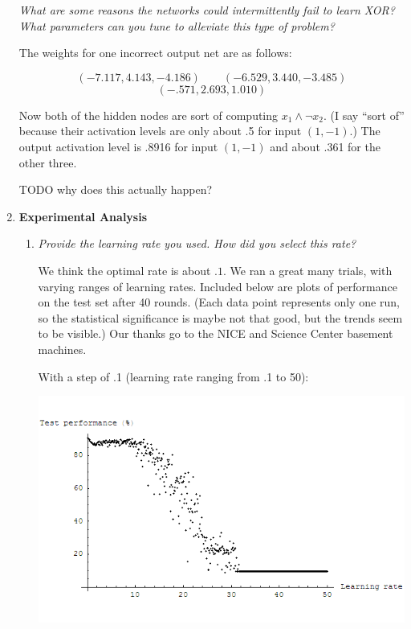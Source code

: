 \documentclass{article}
\begin{document}
\begin{enumerate}
    \textit{What are some reasons the networks could intermittently
      fail to learn XOR?  What parameters can you tune to alleviate
      this type of problem?}

    The weights for one incorrect output net are as follows:

    \[(-7.117, 4.143, -4.186)\qquad(-6.529, 3.440, -3.485)\]
    \[(-.571, 2.693, 1.010)\]

    Now both of the hidden nodes are sort of computing $x_1\wedge\lnot
    x_2$. (I say ``sort of'' because their activation levels are only
    about .5 for input $(1,-1)$.) The output activation level is .8916
    for input $(1,-1)$ and about .361 for the other three.

    TODO why does this actually happen?

  \item \textbf{Experimental Analysis}
    \begin{enumerate}
    \item \textit{Provide the learning rate you used. How did you
      select this rate?}

      We think the optimal rate is about $.1$. We ran a great many
      trials, with varying ranges of learning rates. Included below
      are plots of performance on the test set after 40 rounds. (Each
      data point represents only one run, so the statistical
      significance is maybe not that good, but the trends seem to be
      visible.) Our thanks go to the NICE and Science Center basement
      machines.


      With a step of .1 (learning rate ranging from .1 to 50):

      \begin{center}
        \includegraphics[scale=.5]{plot_test_1.png}
      \end{center}


\end{enumerate}
\end{enumerate}
\end{document}
